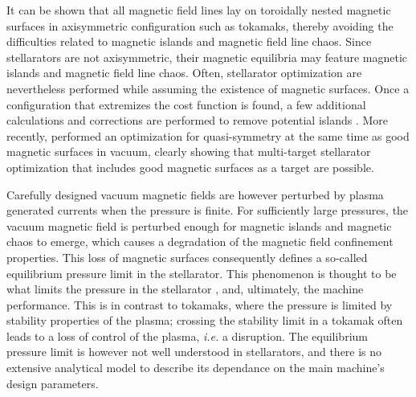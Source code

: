 \documentclass[my_thesis.tex]{subfiles}
\begin{document}
It can be shown \citep{gradHydromagneticEquilibriaForcefree1958,shafranovPlasmaEquilibriumMagnetic1966,Freidberg2014} that all magnetic field lines lay on toroidally nested magnetic surfaces in axisymmetric configuration such as tokamaks, thereby avoiding the difficulties related to magnetic islands and magnetic field line chaos. Since stellarators are not axisymmetric, their magnetic equilibria may feature magnetic islands and magnetic field line chaos. Often, stellarator optimization are nevertheless performed while assuming the existence of magnetic surfaces. Once a configuration that extremizes the cost function is found, a few additional calculations and corrections are performed to remove potential islands \citep{Hanson1984a,Cary1986}. More recently, \citet{Landreman2021a} performed an optimization for quasi-symmetry at the same time as good magnetic surfaces in vacuum, clearly showing that multi-target stellarator optimization that includes good magnetic surfaces as a target are possible.

Carefully designed vacuum magnetic fields are however perturbed by plasma generated currents when the pressure is finite. For sufficiently large pressures, the vacuum magnetic field is perturbed enough for magnetic islands and magnetic chaos to emerge, which causes a degradation of the magnetic field confinement properties. This loss of magnetic surfaces consequently defines a so-called equilibrium pressure limit in the stellarator. This phenomenon is thought to be what limits the pressure in the stellarator \citep{helanderTheoryPlasmaConfinement2014}, and, ultimately, the machine performance. This is in contrast to tokamaks, where the pressure is limited by stability properties of the plasma; crossing the stability limit in a tokamak often leads to a loss of control of the plasma, \textit{i.e.} a disruption. The equilibrium pressure limit is however not well understood in stellarators, and there is no extensive analytical model to describe its dependance on the main machine's design parameters. 
\end{document}
